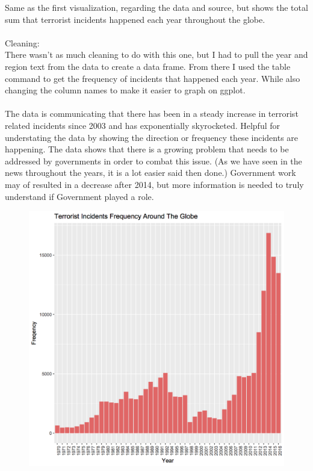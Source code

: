 \documentclass{article}
\begin{document}
Same as the first visualization, regarding the data and source, but shows the total sum that terrorist incidents happened each year throughout the globe.\\
\\
Cleaning:\\
There wasn't as much cleaning to do with this one, but I had to pull the year and region text from the data to create a data frame. From there I used the table command to get the frequency of incidents that happened each year. While also changing the column names to make it easier to graph on ggplot. \\
\\
The data is communicating that there has been in a steady increase in terrorist related incidents since 2003 and has exponentially skyrocketed. Helpful for understating the data by showing the direction or frequency these incidents are happening. The data shows that there is a growing problem that needs to be addressed by governments in order to combat this issue. (As we have seen in the news throughout the years, it is a lot easier said then done.) Government work may of resulted in a decrease after 2014, but more information is needed to truly understand if Government played a role. 
\\
\begin{figure}[H]
\centering
\includegraphics[scale=.8]{Visual_3_PS6.png}
\end{figure}
\end{document}
